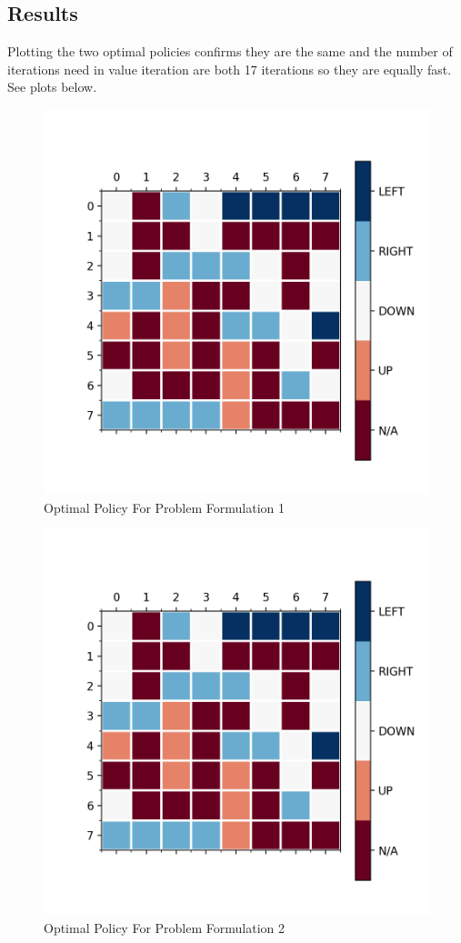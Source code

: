 \documentclass{article}[12pt]
\begin{document}
\subsection{Results}
Plotting the two optimal policies confirms they are the same and the number of iterations need in value iteration are both  17 iterations so they are equally fast. See plots below.

\begin{figure}
  \includegraphics[width=\linewidth]{opt_pol_form1.png}
  \caption{Optimal Policy For Problem Formulation 1}
  \label{fig:optPol1}
\end{figure}
\begin{figure}
  \includegraphics[width=\linewidth]{opt_pol_form2.png}
  \caption{Optimal Policy For Problem Formulation 2}
  \label{fig:optPol2}
\end{figure}
\end{document}
